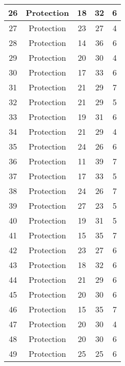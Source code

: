 \documentclass[results.tex]{subfiles}
\begin{document}
\begin{center}
\begin{tabular}{| c || c | c | c | c |}
    \hline
    26 & Protection & 18 & 32 & 6 \\ 
    \hline
    27 & Protection & 23 & 27 & 4 \\ 
    \hline
    28 & Protection & 14 & 36 & 6 \\ 
    \hline
    29 & Protection & 20 & 30 & 4 \\ 
    \hline
    30 & Protection & 17 & 33 & 6 \\ 
    \hline
    31 & Protection & 21 & 29 & 7 \\ 
    \hline
    32 & Protection & 21 & 29 & 5 \\ 
    \hline
    33 & Protection & 19 & 31 & 6 \\ 
    \hline
    34 & Protection & 21 & 29 & 4 \\ 
    \hline
    35 & Protection & 24 & 26 & 6 \\ 
    \hline
    36 & Protection & 11 & 39 & 7 \\ 
    \hline
    37 & Protection & 17 & 33 & 5 \\ 
    \hline
    38 & Protection & 24 & 26 & 7 \\ 
    \hline
    39 & Protection & 27 & 23 & 5 \\ 
    \hline
    40 & Protection & 19 & 31 & 5 \\ 
    \hline
    41 & Protection & 15 & 35 & 7 \\ 
    \hline
    42 & Protection & 23 & 27 & 6 \\ 
    \hline
    43 & Protection & 18 & 32 & 6 \\ 
    \hline
    44 & Protection & 21 & 29 & 6 \\ 
    \hline
    45 & Protection & 20 & 30 & 6 \\ 
    \hline
    46 & Protection & 15 & 35 & 7 \\ 
    \hline
    47 & Protection & 20 & 30 & 4 \\ 
    \hline
    48 & Protection & 20 & 30 & 6 \\ 
    \hline
    49 & Protection & 25 & 25 & 6 \\ 
    \hline   \end{tabular}
\end{center}
\end{document}
